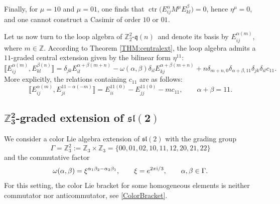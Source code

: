 \documentclass[pdftex]{sigma}
\numberwithin{equation}{section}
\theoremstyle{definition}
\def\Z2{\mathbb{Z}_2^2}
\def\sl{\mathfrak{sl}}
\def\qq{$\Z2$-$\q(n)$}
\def\q{\mathfrak{q}}
\begin{document}
Finally, for $\mu=10$ and $\mu=01$, one finds that $\operatorname{ctr}\bigl(E_{ij}^\alpha M^\mu E_{kl}^\beta\bigr)=0$, hence $\eta^{\mu}=0$, and one cannot construct a Casimir of order $10$ or $01$.

Let us now turn to the loop algebra of \qq \ and denote its basis by $ E_{ij}^{\alpha (m)}$, where $ m \in \mathbb{Z}.$
According to Theorem \ref{THM:centralext}, the loop algebra admits a $11$-graded central extension given by the bilinear form $\eta^{11}$:
\begin{equation*}
	\bigl\llbracket E_{ij}^{\alpha(m)}, E_{kl}^{\beta(n)} \bigr\rrbracket =
	\delta_{jk} E_{il}^{\alpha+\beta(m+n)} - \omega(\alpha,\beta) \delta_{il}E_{kj}^{\alpha+\beta(m+n)}
	+ n \delta_{m+n,0} \delta_{\alpha+\beta,11} \delta_{jk} \delta_{il}c_{11}.
\end{equation*}
More explicitly, the relations containing $c_{11} $ are as follows:
\begin{equation*}
	\bigl\llbracket E_{ij}^{\alpha(m)}, E_{ji}^{11-\alpha(-m)} \bigr\rrbracket = E_{ii}^{11(0)} - E_{jj}^{11(0)} - m c_{11},
	\qquad \alpha+\beta = 11.
\end{equation*}

\subsection[Z\_3\^{}2-graded extension of sl(2)]{$\boldsymbol{\mathbb{Z}_3^2}$-graded extension of $\boldsymbol{\sl(2)}$} \label{SEC:sl2}

We consider a color Lie algebra extension of $\sl(2)$ with the grading group
\begin{equation}
	\Gamma = \mathbb{Z}_3^2 := \mathbb{Z}_3 \times \mathbb{Z}_3 =
	\{
	 00, 01, 02, 10, 11, 12, 20, 21, 22 	\}
\end{equation}
and the commutative factor
\begin{equation}
	\omega(\alpha,\beta) = \xi^{\alpha_1 \beta_2 - \alpha_2 \beta_1},
	\qquad
	\xi = e^{2\pi {\rm i} /3}, \qquad
	\alpha, \beta \in \Gamma .
	\label{Z32omega}
\end{equation}
For this setting, the color Lie bracket for some homogeneous elements is neither commutator nor anticommutator, see \eqref{ColorBracket}.
\end{document}
